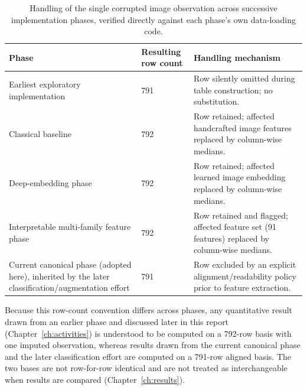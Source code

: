 \begin{table}[htbp]
\centering
\caption{Handling of the single corrupted image observation across
successive implementation phases, verified directly against each phase's
own data-loading code.}
\label{tab:corruption-handling}
\begin{tabular}{p{3.4cm}p{4.0cm}p{5.3cm}}
\toprule
Phase & Resulting row count & Handling mechanism \\
\midrule
Earliest exploratory implementation & 791 & Row silently omitted during
table construction; no substitution. \\
Classical baseline & 792 & Row retained; affected handcrafted image
features replaced by column-wise medians. \\
Deep-embedding phase & 792 & Row retained; affected learned image
embedding replaced by column-wise medians. \\
Interpretable multi-family feature phase & 792 & Row retained and flagged;
affected feature set (91 features) replaced by column-wise medians. \\
Current canonical phase (adopted here), inherited by the later
classification/augmentation effort & 791 & Row excluded by an explicit
alignment/readability policy prior to feature extraction. \\
\bottomrule
\end{tabular}
\end{table}

Because this row-count convention differs across phases, any quantitative
result drawn from an earlier phase and discussed later in this report
(Chapter~\ref{ch:activities}) is understood to be computed on a 792-row
basis with one imputed observation, whereas results drawn from the current
canonical phase and the later classification effort are computed on a
791-row aligned basis. The two bases are not row-for-row identical and are
not treated as interchangeable when results are compared
(Chapter~\ref{ch:results}).

